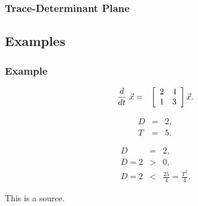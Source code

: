 \begin{frame}
  \frametitle{Trace-Determinant Plane}


  
\end{frame}

\subsection{Examples}

\begin{frame}
  \frametitle{Example}

  \begin{eqnarray*}
    \deriv{~}{t} \vec{x} & = & \arrayTwo{2}{4}{1}{3} \vec{x}.
  \end{eqnarray*}

  {
    \begin{eqnarray*}
      D & = & 2, \\
      T & = & 5.
    \end{eqnarray*}
  }

  {
    \begin{eqnarray*}
      D & = & 2, \\
      D=2 & > & 0, \\
      D = 2 & < & \frac{25}{4} = \frac{T^2}{4}.
    \end{eqnarray*}
  }

  {
    This is a source.
  }


\end{frame}


